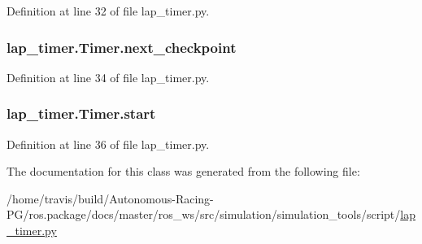 Definition at line 32 of file lap\+\_\+timer.\+py.

\subsubsection[{\texorpdfstring{next\+\_\+checkpoint}{next_checkpoint}}]{\setlength{\rightskip}{0pt plus 5cm}lap\+\_\+timer.\+Timer.\+next\+\_\+checkpoint}\hypertarget{classlap__timer_1_1_timer_a14f57c27d32e7e7591b38708c68a9e98}{}\label{classlap__timer_1_1_timer_a14f57c27d32e7e7591b38708c68a9e98}


Definition at line 34 of file lap\+\_\+timer.\+py.

\subsubsection[{\texorpdfstring{start}{start}}]{\setlength{\rightskip}{0pt plus 5cm}lap\+\_\+timer.\+Timer.\+start}\hypertarget{classlap__timer_1_1_timer_a3543c782f954f47c01b2068674bfe96b}{}\label{classlap__timer_1_1_timer_a3543c782f954f47c01b2068674bfe96b}


Definition at line 36 of file lap\+\_\+timer.\+py.



The documentation for this class was generated from the following file\+:\begin{DoxyCompactItemize}
\item 
/home/travis/build/\+Autonomous-\/\+Racing-\/\+P\+G/ros.\+package/docs/master/ros\+\_\+ws/src/simulation/simulation\+\_\+tools/script/\hyperlink{lap__timer_8py}{lap\+\_\+timer.\+py}\end{DoxyCompactItemize}
